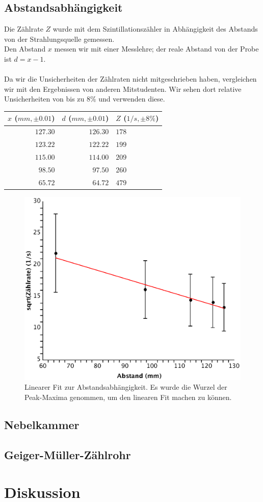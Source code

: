 \documentclass{article}
\begin{document}
\subsection{Abstandsabhängigkeit}
Die Zählrate $Z$ wurde mit dem Szintillationszähler in Abhängigkeit des Abstands von der Strahlungsquelle gemessen.\\
Den Abstand $x$ messen wir mit einer Messlehre; der reale Abstand von der Probe ist $d=x-1$.\\
\\
Da wir die Unsicherheiten der Zählraten nicht mitgeschrieben haben, vergleichen wir mit den Ergebnissen von anderen Mitstudenten. Wir sehen dort relative Unsicherheiten von bis zu $8\%$ und verwenden diese.
\\
\begin{tabular}{|r|r|l|}
\hline
$x$ ($\si{mm}, \pm 0.01$) & $d$ ($\si{mm}, \pm 0.01$) & $Z$ ($1/s, \pm 8\% $)\\
\hline
$127.30$ & $126.30$ & $178$\\
$123.22$ & $122.22$ & $199$\\
$115.00$ & $114.00$ & $209$\\
$98.50$ & $97.50$ & $260$\\
$65.72$ & $64.72$ & $479$\\
\hline
\end{tabular}

\begin{center}
\begin{figure}[H]
\includegraphics[scale=0.6]{abstandwurzel.eps}
\caption{Linearer Fit zur Abstandsabhängigkeit. Es wurde die Wurzel der Peak-Maxima genommen, um den linearen Fit machen zu können.}
\end{figure}
\end{center}

\subsection{Nebelkammer}
\subsection{Geiger-Müller-Zählrohr}

\section{Diskussion}																								
\end{document}
